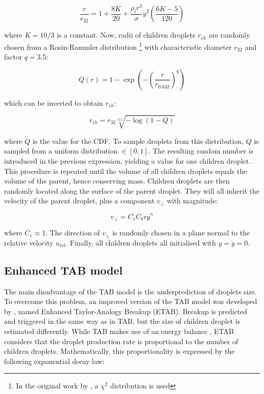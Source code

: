 \begin{equation}
\label{eq:TAB_model_radius_ratio}
\frac{r}{r_{32}} = 1 + \frac{8 K}{20} + \frac{\rho_l r^3}{\sigma} \dot{y}^2 \left( \frac{6 K - 5}{120} \right)
\end{equation}

where $K = 10/3$ is a constant. Now, radii of children droplets $r_{ch}$ are randomly chosen from a Rosin-Rammler distribution \footnote{In the original work by , a $\chi^2$ distribution is used} with characteristic diameter $r_{32}$ and factor $q = 3.5$: 


\begin{equation}
\label{eq:rossin_rammler_distribution}
Q \left( r \right) = 1 - \exp\left(  - \left( \frac{r}{r_{0.632}} \right)^q \right)
\end{equation}

which can be inverted to obtain $r_{ch}$:

\begin{equation}
r_{ch} = r_{32} \sqrt[3.5]{- \log \left( 1 - Q \right) }
\end{equation}

where $Q$ is the value for the CDF. To sample droplets from this distribution, $Q$ is sampled from a uniform distribution $\in [0,1]$. The resulting random number is introduced in the previous expression, yielding a value for one children droplet. This procedure is repeated until the volume of all children droplets equals the volume of the parent, hence conserving mass. Children droplets are then randomly located along the surface of the parent droplet. They will all inherit the velocity of the parent droplet, plus a component $v_\perp$ with magnitude:

\begin{equation}
\label{eq:TAB_v_perp}
v_\perp = C_v C_b r \dot{y}^n
\end{equation}

where $C_v \approx 1$. The direction of $v_\perp$ is randomly chosen in a plane normal to the relative velocity $u_\mathrm{rel}$. Finally, all children droplets all initialised with $y = \dot{y} = 0$.



\subsection{Enhanced TAB model}

The main disadvantage of the TAB model is the underprediction of droplets size. To overcome this problem, an improved version of the TAB model was developed by , named Enhanced Taylor-Analogy Breakup (ETAB). Breakup is predicted and triggered in the same way as in TAB, but the size of children droplet is estimated differently. While TAB makes use of an energy balance , ETAB considers that the droplet production rate is proportional to the number of children droplets. Mathematically, this proportionality is expressed by the following exponential decay law:


